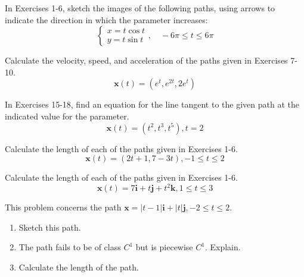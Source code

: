 \documentclass[12pt,letterpaper]{hmcpset}
\begin{document}

\begin{problem}[3.1.3]
    In Exercises 1-6, sketch the images of the following paths, using
    arrows to indicate the direction in which the parameter increases:
    \[
        \begin{cases}
            x=t\cos t\\
            y=t\sin t
        \end{cases}
        ,\quad-6\pi\leq t\leq6\pi
    \]
\end{problem}
\begin{solution}
    \vfill
\end{solution}
\newpage

\begin{problem}[3.1.10]
    Calculate the velocity, speed, and acceleration of the paths given
    in Exercises 7-10.
    \[
        \textbf{x}(t)=(e^t,e^{2t},2e^t)
    \]
\end{problem}
\begin{solution}
    \vfill
\end{solution}
\newpage

\begin{problem}[3.1.17]
    In Exercises 15-18, find an equation for the line tangent to the
    given path at the indicated value for the parameter.
    \[
        \textbf{x}(t)=(t^2,t^3,t^5),t=2
    \]
\end{problem}
\begin{solution}
    \vfill
\end{solution}
\newpage

\begin{problem}[3.2.1]
    Calculate the length of each of the paths given in Exercises 1-6.
    \[
        \textbf{x}(t)=(2t+1,7-3t),-1\leq t\leq2
    \]
\end{problem}
\begin{solution}
    \vfill
\end{solution}
\newpage

\begin{problem}[3.2.4]
    Calculate the length of each of the paths given in Exercises 1-6.
    \[
        \textbf{x}(t)=7\textbf{i}+t\textbf{j}+t^2\textbf{k},1\leq t\leq3
    \]
\end{problem}
\begin{solution}
    \vfill
\end{solution}
\newpage

\begin{problem}[3.2.13]
    This problem concerns the path $\textbf{x}=|t-1|\textbf{i}
    +|t|\textbf{j},-2\leq t\leq2$.
    \begin{enumerate}
        \item Sketch this path.
        \item The path fails to be of class $C^1$ but is piecewise $C^1$.
            Explain.
        \item Calculate the length of the path.
    \end{enumerate}
\end{problem}
\begin{solution}
    \vfill
\end{solution}
\newpage
\end{document}
